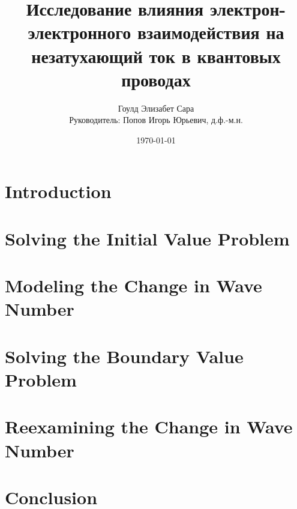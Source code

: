 \documentclass[A4,12pt,oneside]{report}
\renewcommand{\(}{\left(}
\renewcommand{\)}{\right)}
\begin{document}
\title{Исследование влияния электрон-электронного взаимодействия на
незатухающий ток в квантовых проводах}

\author{Гоулд Элизабет Сара\\
Руководитель: Попов Игорь Юрьевич, д.ф.-м.н.
}



 
\date{\today}

\maketitle

% 


\chapter{Introduction}
\chapter{Solving the Initial Value Problem}
\chapter{Modeling the Change in Wave Number}
\chapter{Solving the Boundary Value Problem}
\chapter{Reexamining the Change in Wave Number}
\chapter{Conclusion}


\lstset{style=codejupytr}
\end{document}
